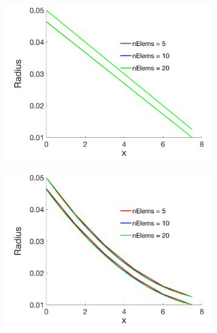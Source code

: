 \documentclass[a4paper]{article}
\begin{document}
\begin{figure} [H]
  \begin{subfigure}{0.445\textwidth}
    \centering
    \includegraphics[width=1.0\linewidth]{p1.png}
    \label{fig:linear}
  \end{subfigure}
  \begin{subfigure}{0.45\textwidth}
    \centering
    \includegraphics[width=1.0\linewidth]{p2.png}
    \label{fig:quadratic}
  \end{subfigure}\\[4ex]
  \begin{subfigure}{0.45\textwidth}
    \centering

\end{subfigure}
\end{figure}
\end{document}
